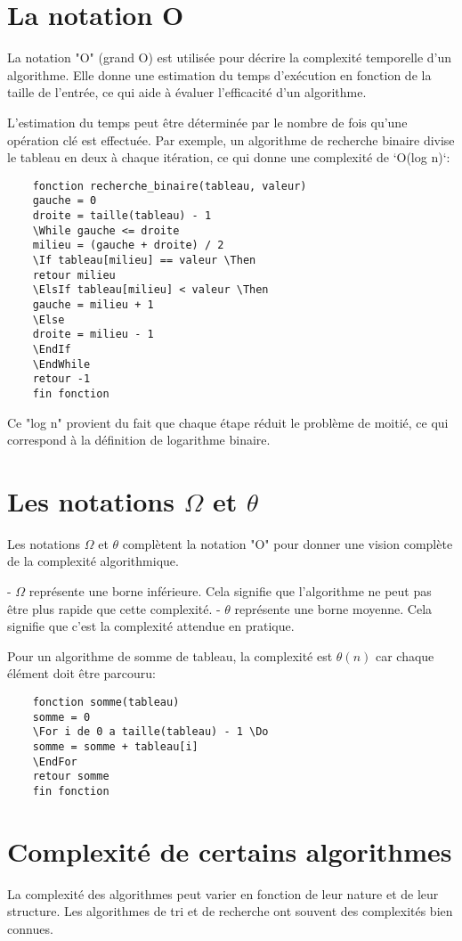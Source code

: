 \section{La notation O}
La notation "O" (grand O) est utilisée pour décrire la complexité temporelle d'un algorithme. Elle donne une estimation du temps d'exécution en fonction de la taille de l'entrée, ce qui aide à évaluer l'efficacité d'un algorithme. 

L'estimation du temps peut être déterminée par le nombre de fois qu'une opération clé est effectuée. Par exemple, un algorithme de recherche binaire divise le tableau en deux à chaque itération, ce qui donne une complexité de `O(log n)`:

\begin{lstlisting}
	fonction recherche_binaire(tableau, valeur)
	gauche = 0
	droite = taille(tableau) - 1
	\While gauche <= droite
	milieu = (gauche + droite) / 2
	\If tableau[milieu] == valeur \Then
	retour milieu
	\ElsIf tableau[milieu] < valeur \Then
	gauche = milieu + 1
	\Else
	droite = milieu - 1
	\EndIf
	\EndWhile
	retour -1
	fin fonction
\end{lstlisting}

Ce "log n" provient du fait que chaque étape réduit le problème de moitié, ce qui correspond à la définition de logarithme binaire.

\section{Les notations $\Omega$ et $\theta$}
Les notations $\Omega$ et $\theta$ complètent la notation "O" pour donner une vision complète de la complexité algorithmique.

- $\Omega$ représente une borne inférieure. Cela signifie que l'algorithme ne peut pas être plus rapide que cette complexité.
- $\theta$ représente une borne moyenne. Cela signifie que c'est la complexité attendue en pratique.

Pour un algorithme de somme de tableau, la complexité est $\theta(n)$ car chaque élément doit être parcouru:

\begin{lstlisting}
	fonction somme(tableau)
	somme = 0
	\For i de 0 a taille(tableau) - 1 \Do
	somme = somme + tableau[i]
	\EndFor
	retour somme
	fin fonction
\end{lstlisting}

\section{Complexité de certains algorithmes}
La complexité des algorithmes peut varier en fonction de leur nature et de leur structure. Les algorithmes de tri et de recherche ont souvent des complexités bien connues.

